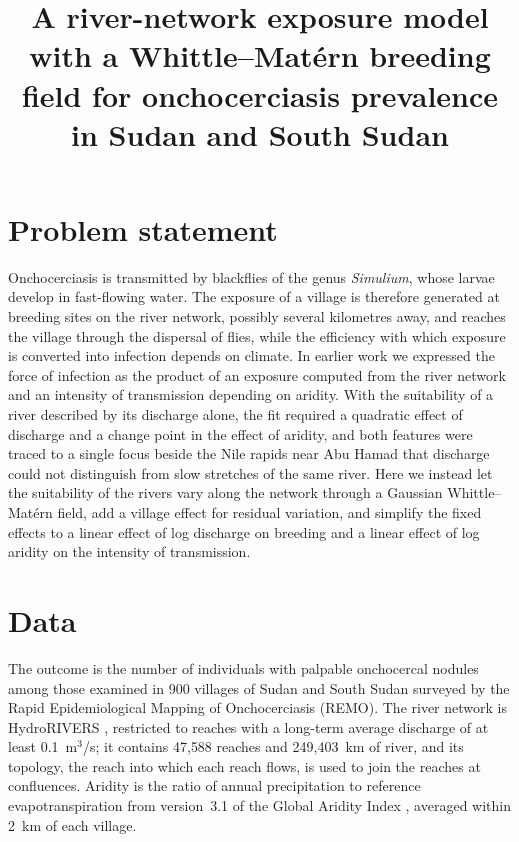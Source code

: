 \documentclass[11pt,a4paper]{article}
\title{A river-network exposure model with a Whittle--Mat\'ern breeding field for onchocerciasis prevalence in Sudan and South Sudan}
\author{}
\date{}
\begin{document}
\maketitle

\section{Problem statement}

Onchocerciasis is transmitted by blackflies of the genus \textit{Simulium}, whose larvae develop in fast-flowing water. The exposure of a village is therefore generated at breeding sites on the river network, possibly several kilometres away, and reaches the village through the dispersal of flies, while the efficiency with which exposure is converted into infection depends on climate. In earlier work we expressed the force of infection as the product of an exposure computed from the river network and an intensity of transmission depending on aridity. With the suitability of a river described by its discharge alone, the fit required a quadratic effect of discharge and a change point in the effect of aridity, and both features were traced to a single focus beside the Nile rapids near Abu Hamad that discharge could not distinguish from slow stretches of the same river. Here we instead let the suitability of the rivers vary along the network through a Gaussian Whittle--Mat\'ern field, add a village effect for residual variation, and simplify the fixed effects to a linear effect of log discharge on breeding and a linear effect of log aridity on the intensity of transmission.

\section{Data}

The outcome is the number of individuals with palpable onchocercal nodules among those examined in 900 villages of Sudan and South Sudan surveyed by the Rapid Epidemiological Mapping of Onchocerciasis (REMO). The river network is HydroRIVERS \citep{lehner2013}, restricted to reaches with a long-term average discharge of at least 0.1~m$^3$/s; it contains 47{,}588 reaches and 249{,}403~km of river, and its topology, the reach into which each reach flows, is used to join the reaches at confluences. Aridity is the ratio of annual precipitation to reference evapotranspiration from version~3.1 of the Global Aridity Index \citep{zomer2022}, averaged within 2~km of each village.
\end{document}

